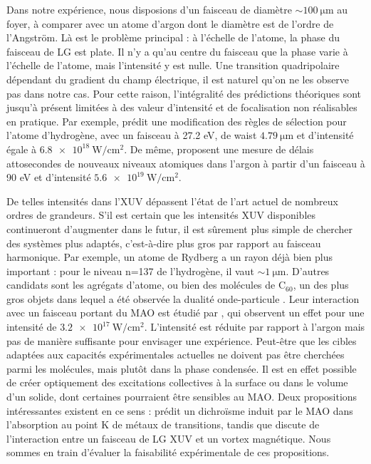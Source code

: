 Dans notre expérience, nous disposions d'un faisceau de diamètre $\sim \SI{100}{\micro\metre}$ au foyer, à comparer avec un atome d'argon dont le diamètre est de l'ordre de l'Angström. Là est le problème principal : à l'échelle de l'atome, la phase du faisceau de LG est plate. Il n'y a qu'au centre du faisceau que la phase varie à l'échelle de l'atome, mais l'intensité y est nulle. Une transition quadripolaire dépendant du gradient du champ électrique, il est naturel qu'on ne les observe pas  dans notre cas. Pour cette raison, l'intégralité des prédictions théoriques sont jusqu'à présent limitées à des valeur d'intensité et de focalisation non réalisables en pratique. Par exemple,  prédit une modification des règles de sélection pour l'atome d'hydrogène, avec un faisceau à 27.2 eV, de waist $\SI{4.79}{\micro\metre}$ et d'intensité égale à $\SI{6.8e18}{\W\per\centi\metre\squared}$. De même,  proposent une mesure de délais attosecondes de nouveaux niveaux atomiques dans l'argon à partir d'un faisceau à 90 eV et d'intensité $\SI{5.6e19}{\W\per\centi\metre\squared}$.

De telles intensités dans l'XUV dépassent l'état de l'art actuel de nombreux ordres de grandeurs. S'il est certain que les intensités XUV disponibles continueront d'augmenter dans le futur, il est sûrement plus simple de chercher des systèmes plus adaptés, c'est-à-dire plus gros par rapport au faisceau harmonique. Par exemple, un atome de Rydberg a un rayon déjà bien plus important : pour le niveau n=137 de l'hydrogène, il vaut $\sim\SI{1}{\micro\metre}$. D'autres candidats sont les agrégats d'atome, ou bien des molécules de $\text{C}_{60}$, un des plus gros objets dans lequel a été observée la dualité onde-particule . Leur interaction avec un faisceau portant du MAO est étudié par , qui observent un effet pour une intensité de $\SI{3.2e17}{\W\per\centi\metre\squared}$. L'intensité est réduite par rapport à l'argon mais pas de manière suffisante pour envisager une expérience.\linebreak
Peut-être que les cibles adaptées aux capacités expérimentales actuelles ne doivent pas être cherchées parmi les molécules, mais plutôt dans la phase condensée. Il est en effet possible de créer optiquement des excitations collectives à la surface ou dans le volume d'un solide, dont certaines pourraient être sensibles au MAO. Deux propositions intéressantes existent en ce sens :  prédit un dichroïsme induit par le MAO dans l'absorption au point K de métaux de transitions, tandis que  discute de l'interaction entre un faisceau de LG XUV et un vortex magnétique. Nous sommes en train d'évaluer la faisabilité expérimentale de ces propositions.

